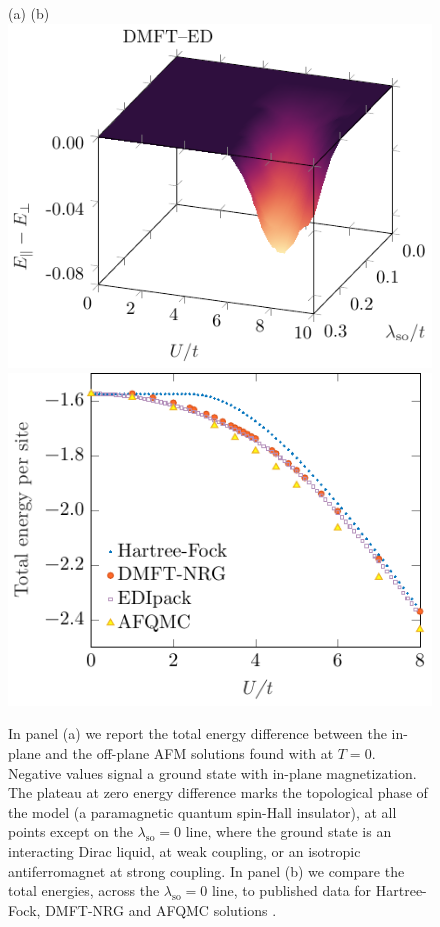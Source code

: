 \documentclass[edipack_sp.tex]{subfiles}
\begin{document}
\begin{figure}
\hspace{1cm} (a) \hspace{6.5cm} (b)\\
    \includegraphics[width=0.47\linewidth,trim={0 0 0 5mm},clip]{figures/KMH_energy.pdf}\hfill
    \includegraphics[width=0.45\linewidth]{figures/benchEnergy_honey.pdf}\\
    \caption{In panel (a) we report the total energy difference between 
    the in-plane and the
    off-plane AFM solutions found with \NAME at $T=0$. Negative values
    signal a ground state with in-plane magnetization. The plateau at zero
    energy difference marks the topological phase of the model (a 
    paramagnetic quantum spin-Hall insulator), at all points except on the $\lambda_\mathrm{so}=0$ line, where the ground state is an interacting
    Dirac liquid, at weak coupling, or an isotropic antiferromagnet at strong coupling. In panel (b) we compare the total energies, across the 
    $\lambda_\mathrm{so}=0$ line, to published data for Hartree-Fock,
    DMFT-NRG and AFQMC solutions \cite{Raczkowski2020PRB}.}
    \label{fig:KMenergy}
\end{figure}
\end{document}
